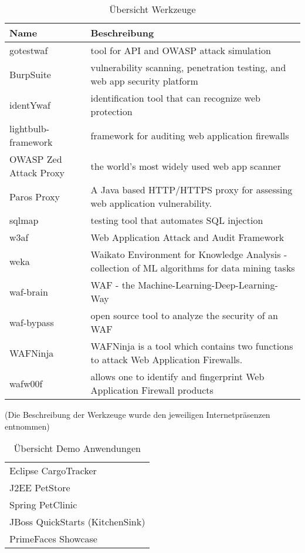 \begin{table}[h]
  \centering
  \begin{tabular}{|l | p{7cm} |}
    \hline
    \textbf{Name} & \textbf{Beschreibung} \\
    \hline
    gotestwaf & tool for API and OWASP attack simulation \\
    BurpSuite & vulnerability scanning, penetration testing, and web app security platform\\
    identYwaf & identification tool that can recognize web protection \\
    lightbulb-framework & framework for auditing web application firewalls \\
    OWASP Zed Attack Proxy & the world's most widely used web app scanner \\
    Paros Proxy & A Java based HTTP/HTTPS proxy for assessing web application vulnerability.\\
    sqlmap & testing tool that automates SQL injection\\
    w3af & Web Application Attack and Audit Framework\\
    weka & Waikato Environment for Knowledge Analysis - collection of ML algorithms for data mining tasks\\
    waf-brain & WAF - the Machine-Learning-Deep-Learning-Way\\
    waf-bypass & open source tool to analyze the security of an WAF\\
    WAFNinja &  WAFNinja is a tool which contains two functions to attack Web Application Firewalls. \\
    wafw00f & allows one to identify and fingerprint Web Application Firewall products\\
    \hline
  \end{tabular}
  
  \caption{Übersicht Werkzeuge}
  \medskip
  \small
  (Die Beschreibung der Werkzeuge wurde den jeweiligen Internetpräsenzen entnommen)
  \label{tab:my_tools}
\end{table}

\begin{table}[h]
  \centering
  \begin{tabular}{|l|}
    \hline
    Eclipse CargoTracker \\
    J2EE PetStore \\
    Spring PetClinic \\
    JBoss QuickStarts (KitchenSink) \\
    PrimeFaces Showcase \\
    \hline
  \end{tabular}
  \caption{Übersicht Demo Anwendungen}
  \label{tab:exampleapp}
\end{table}

